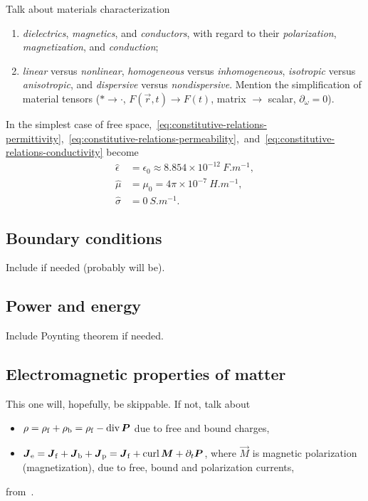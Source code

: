 \documentclass[11pt,a4paper,twoside,openany]{report}
\begin{document}
            \noindent%
            Talk about materials characterization
            \begin{enumerate}
                \item \emph{dielectrics}, \emph{magnetics}, and \emph{conductors}, with regard to their \emph{polarization}, \emph{magnetization}, and \emph{conduction};
                \item \emph{linear} versus \emph{nonlinear}, \emph{homogeneous} versus \emph{inhomogeneous}, \emph{isotropic} versus \emph{anisotropic}, and \emph{dispersive} versus \emph{nondispersive}. Mention the simplification of material tensors ($\ast\to\cdot$, $F(\vec r,t) \to F(t)$, matrix $\to$ scalar, $\partial_\omega = 0$).
            \end{enumerate}

            \noindent%
            In the simplest case of free space,~\eqref{eq:constitutive-relations-permittivity},~\eqref{eq:constitutive-relations-permeability},~and~\eqref{eq:constitutive-relations-conductivity} become
            \begin{align}
                \hat\epsilon &= \epsilon_0 \approx 8.854\times 10^{-12}\ \unit{F.m^{-1}},
            \\
                \hat\mu &= \mu_0 = 4\pi\times 10^{-7}\ \unit{H.m^{-1}},
            \\
                \hat\sigma &= 0\ \unit{S.m^{-1}}.
            \end{align}

        \subsection{Boundary conditions}
            Include if needed (probably will be).

        \subsection{Power and energy}
            Include Poynting theorem if needed.
    
        \subsection{Electromagnetic properties of matter}
            This one will, hopefully, be skippable. If not, talk about
            \begin{itemize}
                \item $\rho = \rho_{\mathrm f} + \rho_{\mathrm b} = \rho_{\mathrm f} - \operatorname{div}\boldsymbol P$ due to free and bound charges,
                \item $\boldsymbol J_{\mathrm e} = \boldsymbol J_{\mathrm f} + \boldsymbol J_{\mathrm b} + \boldsymbol J_{\mathrm p} = \boldsymbol J_{\mathrm f} + \operatorname{curl} \boldsymbol M + \partial_t\boldsymbol P$, where $\vec M$ is magnetic polarization (magnetization), due to free, bound and polarization currents,
            \end{itemize}
            from~\cite{griffiths:introduction-to-electrodynamics}.
    
\end{document}
